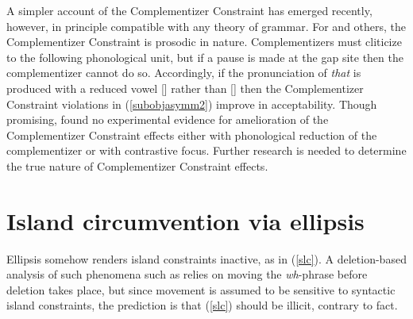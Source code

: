 \documentclass[output=paper
	        ,collection
	        ,collectionchapter
 	        ,biblatex
                ,babelshorthands
                ,newtxmath
                ,draftmode
                ,colorlinks, citecolor=brown
]{langscibook}
\begin{document}
A simpler account of the  Complementizer Constraint has emerged recently, however, in principle compatible with any theory of grammar. For \citet{Kandy06,Kandy09} and others,  the Complementizer Constraint is prosodic in nature.  Complementizers must cliticize to the following phonological unit, but if a pause is made at the gap site then the complementizer cannot do so.  Accordingly, if the pronunciation of \emph{that} is
produced with a reduced vowel [] rather than [] then the
Complementizer Constraint violations in (\ref{subobjasymm2}) improve in acceptability. Though promising,
\citet{Richart} found no experimental evidence for amelioration of the Complementizer Constraint effects
either with phonological reduction of the complementizer or with contrastive focus. Further research is needed
to determine the true nature of  Complementizer Constraint effects.



\section{Island circumvention via ellipsis}

Ellipsis somehow renders island  constraints inactive, as in (\ref{slc}). A deletion-based analysis of such phenomena such as  \citet{merchantbook}  relies on moving the \emph{wh}-phrase before deletion takes place, but since  movement is assumed to be sensitive to syntactic island constraints, the  prediction is that (\ref{slc}) should be illicit, contrary to fact. 

\eal  \label{slc}



\zl
\end{document}
